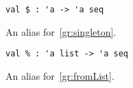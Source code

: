\begin{cluster}
\label{grp:grm:seq-interface::alias}

\begin{gram}[\$]
\label{grm:seq-interface::alias}
\begin{verbatim}
val $ : 'a -> 'a seq
\end{verbatim}
An alias for~\ref{gr:singleton}.

\end{gram}
\end{cluster}

\begin{cluster}
\label{grp:grm:seq-interface::list}

\begin{gram}[\%]
\label{grm:seq-interface::list}
\begin{verbatim}
val % : 'a list -> 'a seq
\end{verbatim}
An alias for~\ref{gr:fromList}.

\end{gram}
\end{cluster}

